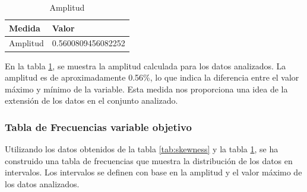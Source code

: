 \begin{table}[H]
    \centering
    \caption{Amplitud}
    \begin{tabular}{ll}
        \hline
        \textbf{Medida} & \textbf{Valor}     \\
        \hline
        Amplitud        & 0.5600809456082252 \\
        \hline
    \end{tabular}%
    \label{tab:amplitud}%
\end{table}%

En la tabla \ref{tab:amplitud}, se muestra la amplitud calculada para los datos analizados. La amplitud es de aproximadamente 0.56\%, lo que indica la diferencia entre el valor máximo y mínimo de la variable. Esta medida nos proporciona una idea de la extensión de los datos en el conjunto analizado.

\subsubsection{Tabla de Frecuencias variable objetivo}

Utilizando los datos obtenidos de la tabla \ref{tab:skewness} y la tabla \ref{tab:amplitud}, se ha construido una tabla de frecuencias que muestra la distribución de los datos en intervalos. Los intervalos se definen con base en
la amplitud y el valor máximo de los datos analizados.

